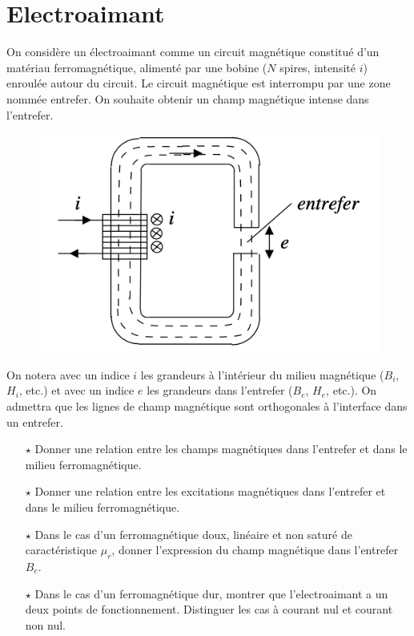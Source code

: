 \documentclass{report}
\begin{document}
\newpage

\section*{Electroaimant}

On considère un électroaimant comme un circuit magnétique constitué d'un matériau ferromagnétique, alimenté par une bobine ($N$ spires, intensité $i$) enroulée autour du circuit. Le circuit magnétique est interrompu par une zone nommée entrefer. On souhaite obtenir un champ magnétique intense dans l'entrefer. 

	\begin{figure}[h!]
	\centering
		\includegraphics[scale=0.6]{electroaimant.png}
	\end{figure}	

On notera avec un indice $i$ les grandeurs à l'intérieur du milieu magnétique ($B_i$, $H_i$, etc.) et avec un indice $e$ les grandeurs dans l'entrefer ($B_e$, $H_e$, etc.). On admettra que les lignes de champ magnétique sont orthogonales à l’interface dans un entrefer.

\begin{itemize}

	\item[$\star$] Donner une relation entre les champs magnétiques dans l'entrefer et dans le milieu ferromagnétique.
	
	\item[$\star$] Donner une relation entre les excitations magnétiques dans l'entrefer et dans le milieu ferromagnétique.
	
	\item[$\star$] Dans le cas d'un ferromagnétique doux, linéaire et non saturé de caractéristique $\mu_r$, donner l'expression du champ magnétique dans l'entrefer $B_e$.
	
	\item[$\star$] Dans le cas d'un ferromagnétique dur, montrer que l'electroaimant a un deux points de fonctionnement. Distinguer les cas à courant nul et courant non nul.

\end{itemize}
\end{document}
